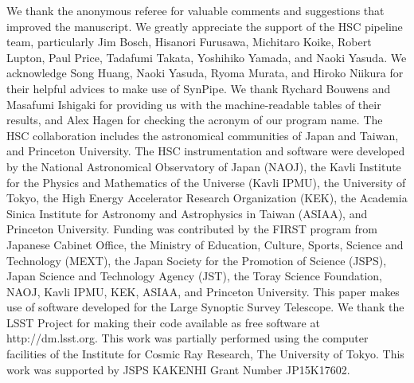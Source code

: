 \documentclass[]{pasj01}
\begin{document}
\begin{ack}

We thank the anonymous referee for valuable comments and suggestions 
that improved the manuscript. 
We greatly appreciate the support of the HSC pipeline team, 
particularly Jim Bosch, Hisanori Furusawa, Michitaro Koike, 
Robert Lupton, Paul Price, Tadafumi Takata, Yoshihiko Yamada, 
and Naoki Yasuda. 
%
We acknowledge Song Huang, Naoki Yasuda, Ryoma Murata, and Hiroko Niikura 
for their helpful advices to make use of SynPipe. 
%
We thank 
Rychard Bouwens and Masafumi Ishigaki 
for providing us with the machine-readable tables of their results, 
and 
Alex Hagen  
%
for checking the acronym of our program name. 
%
The HSC collaboration 
includes the astronomical communities of Japan and Taiwan, and Princeton University. 
The HSC instrumentation and software were developed by 
the National Astronomical Observatory of Japan (NAOJ), 
the Kavli Institute for the Physics and Mathematics of the Universe (Kavli IPMU), 
the University of Tokyo, the High Energy Accelerator Research Organization (KEK), 
the Academia Sinica Institute for Astronomy and Astrophysics in Taiwan (ASIAA), 
and Princeton University.  
Funding was contributed by the FIRST program from Japanese Cabinet Office, 
the Ministry of Education, Culture, Sports, Science and Technology (MEXT), 
the Japan Society for the Promotion of Science (JSPS),  
Japan Science and Technology Agency  (JST),  the Toray Science Foundation,
NAOJ, Kavli IPMU, KEK, ASIAA,  and Princeton University.
%
This paper makes use of software developed for the Large Synoptic Survey Telescope. 
We thank the LSST Project for making their code available as free software at 
http://dm.lsst.org.
%
This work was partially performed using the computer facilities of
the Institute for Cosmic Ray Research, The University of Tokyo. 
This work was supported by JSPS KAKENHI Grant Number JP15K17602.

\end{ack}





%
%

\end{document}

